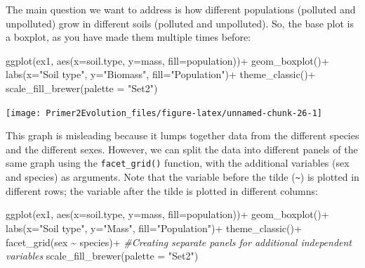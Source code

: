 \documentclass[
]{book}
\newenvironment{Shaded}{\begin{snugshade}}{\end{snugshade}}
\newcommand{\AttributeTok}[1]{\textcolor[rgb]{0.77,0.63,0.00}{#1}}
\newcommand{\CommentTok}[1]{\textcolor[rgb]{0.56,0.35,0.01}{\textit{#1}}}
\newcommand{\FunctionTok}[1]{\textcolor[rgb]{0.00,0.00,0.00}{#1}}
\newcommand{\NormalTok}[1]{#1}
\newcommand{\SpecialCharTok}[1]{\textcolor[rgb]{0.00,0.00,0.00}{#1}}
\newcommand{\StringTok}[1]{\textcolor[rgb]{0.31,0.60,0.02}{#1}}
\begin{document}
The main question we want to address is how different populations (polluted and unpolluted) grow in different soils (polluted and unpolluted). So, the base plot is a boxplot, as you have made them multiple times before:

\begin{Shaded}
\begin{Highlighting}[]
\FunctionTok{ggplot}\NormalTok{(ex1, }\FunctionTok{aes}\NormalTok{(}\AttributeTok{x=}\NormalTok{soil.type, }\AttributeTok{y=}\NormalTok{mass, }\AttributeTok{fill=}\NormalTok{population))}\SpecialCharTok{+}
    \FunctionTok{geom\_boxplot}\NormalTok{()}\SpecialCharTok{+}
    \FunctionTok{labs}\NormalTok{(}\AttributeTok{x=}\StringTok{"Soil type"}\NormalTok{, }\AttributeTok{y=}\StringTok{"Biomass"}\NormalTok{, }\AttributeTok{fill=}\StringTok{"Population"}\NormalTok{)}\SpecialCharTok{+}
    \FunctionTok{theme\_classic}\NormalTok{()}\SpecialCharTok{+}
    \FunctionTok{scale\_fill\_brewer}\NormalTok{(}\AttributeTok{palette =} \StringTok{"Set2"}\NormalTok{)}
\end{Highlighting}
\end{Shaded}

\texttt{[image: Primer2Evolution\_files/figure-latex/unnamed-chunk-26-1]}

This graph is misleading because it lumps together data from the different species and the different sexes. However, we can split the data into different panels of the same graph using the \texttt{facet\_grid()} function, with the additional variables (sex and species) as arguments. Note that the variable before the tilde (\texttt{\textasciitilde{}}) is plotted in different rows; the variable after the tilde is plotted in different columns:

\begin{Shaded}
\begin{Highlighting}[]
\FunctionTok{ggplot}\NormalTok{(ex1, }\FunctionTok{aes}\NormalTok{(}\AttributeTok{x=}\NormalTok{soil.type, }\AttributeTok{y=}\NormalTok{mass, }\AttributeTok{fill=}\NormalTok{population))}\SpecialCharTok{+}
    \FunctionTok{geom\_boxplot}\NormalTok{()}\SpecialCharTok{+}
    \FunctionTok{labs}\NormalTok{(}\AttributeTok{x=}\StringTok{"Soil type"}\NormalTok{, }\AttributeTok{y=}\StringTok{"Mass"}\NormalTok{, }\AttributeTok{fill=}\StringTok{"Population"}\NormalTok{)}\SpecialCharTok{+}
    \FunctionTok{theme\_classic}\NormalTok{()}\SpecialCharTok{+}
    \FunctionTok{facet\_grid}\NormalTok{(sex }\SpecialCharTok{\textasciitilde{}}\NormalTok{ species)}\SpecialCharTok{+} \CommentTok{\#Creating separate panels for additional independent variables}
    \FunctionTok{scale\_fill\_brewer}\NormalTok{(}\AttributeTok{palette =} \StringTok{"Set2"}\NormalTok{)}
\end{Highlighting}
\end{Shaded}
\end{document}
